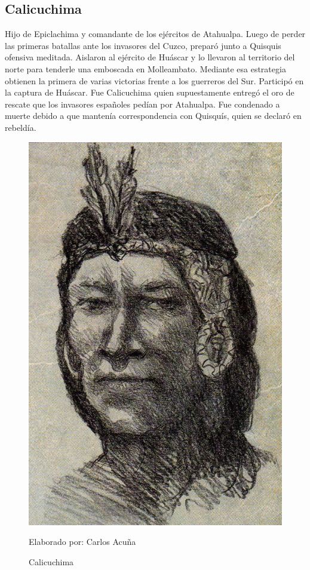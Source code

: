 \documentclass[a4paper, openright, 12pt]{report}
\begin{document}
\clearpage
\subsection*{Calicuchima}
\justify
Hijo de Epiclachima y comandante de los ejércitos de Atahualpa. Luego de perder las primeras batallas ante los invasores del Cuzco, preparó junto a Quisquis ofensiva meditada. Aislaron al ejército de Huáscar y lo llevaron al territorio del norte para tenderle una emboscada en Molleambato. Mediante esa estrategia obtienen la primera de varias victorias frente a los guerreros del Sur. Participó en la captura de Huáscar. Fue Calicuchima quien supuestamente entregó el oro de rescate que los invasores españoles pedían por Atahualpa. Fue condenado a muerte debido a que mantenía correspondencia con Quisquís, quien se declaró en rebeldía. \cite{2010batallas}

\begin{figure}[h]
\captionsetup{justification=centering,margin=2cm}
\includegraphics[scale=1]{h6}
\centering
\caption{Calicuchima}
Elaborado por: Carlos Acuña
\label{fig:h6}
\end{figure}
\end{document}
